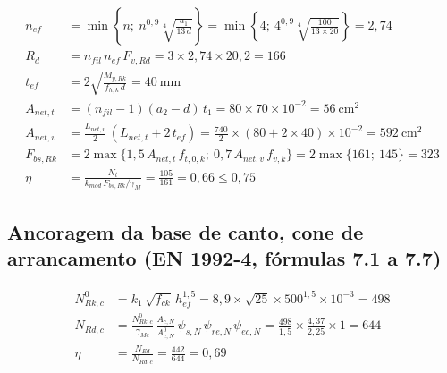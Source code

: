 \begin{align}
    n_{ef} &= \min\left\{n;\ n^{0{,}9}\sqrt[4]{\frac{a_1}{13\,d}}\right\} = \min\left\{4;\ 4^{0{,}9}\sqrt[4]{\frac{100}{13 \times 20}}\right\} = 2{,}74 \nonumber \\
    R_d &= n_{fil}\,n_{ef}\,F_{v,Rd} = 3 \times 2{,}74 \times 20{,}2 = 166 \nonumber \\
    t_{ef} &= 2\sqrt{\frac{M_{y,Rk}}{f_{h,k}\,d}} = 40~\text{mm} \nonumber \\
    A_{net,t} &= (n_{fil} - 1)(a_2 - d)\,t_1 = 80 \times 70 \times 10^{-2} = 56~\text{cm}^2 \nonumber \\
    A_{net,v} &= \frac{L_{net,v}}{2}\,(L_{net,t} + 2\,t_{ef}) = \frac{740}{2} \times (80 + 2 \times 40) \times 10^{-2} = 592~\text{cm}^2 \nonumber \\
    F_{bs,Rk} &= 2\max\{1{,}5\,A_{net,t}\,f_{t,0,k};\ 0{,}7\,A_{net,v}\,f_{v,k}\} = 2\max\{161;\ 145\} = 323 \nonumber \\
    \eta &= \frac{N_t}{k_{mod}\,F_{bs,Rk}/\gamma_M} = \frac{105}{161} = 0{,}66 \leq 0{,}75
    \label{eq:mem-pe-bloco}
\end{align}
\subsection*{Ancoragem da base de canto, cone de arrancamento (EN 1992-4, fórmulas 7.1 a 7.7)}

\begin{align}
    N^0_{Rk,c} &= k_1\,\sqrt{f_{ck}}\,h_{ef}^{1{,}5} = 8{,}9 \times \sqrt{25} \times 500^{1{,}5} \times 10^{-3} = 498 \nonumber \\
    N_{Rd,c} &= \frac{N^0_{Rk,c}}{\gamma_{Mc}}\,\frac{A_{c,N}}{A^0_{c,N}}\,\psi_{s,N}\,\psi_{re,N}\,\psi_{ec,N} = \frac{498}{1{,}5} \times \frac{4{,}37}{2{,}25} \times 1 = 644 \nonumber \\
    \eta &= \frac{N_{Ed}}{N_{Rd,c}} = \frac{442}{644} = 0{,}69
    \label{eq:mem-ancoragem}
\end{align}

\allowdisplaybreaks[0]

